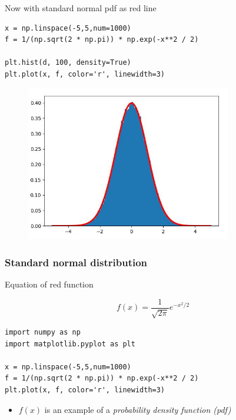 \documentclass[english,14pt]{beamer}
\newcommand\red[1]{{\color{red} #1}}
\begin{document}
\begin{frame}[fragile]

\frametitle{}

Now with standard normal pdf as red line

\begin{lstlisting}[style=CStyle,basicstyle=\scriptsize]
x = np.linspace(-5,5,num=1000)
f = 1/(np.sqrt(2 * np.pi)) * np.exp(-x**2 / 2)

plt.hist(d, 100, density=True)
plt.plot(x, f, color='r', linewidth=3)
\end{lstlisting}

\begin{figure}[ht]
	\centering
	\includegraphics[width=0.8\textwidth]{figures/histWithpdf}
\end{figure}

\end{frame}


\begin{frame}[fragile]

\frametitle{Standard normal distribution}

Equation of red function

\[
f(x) = \frac{1}{\sqrt{2\pi}} e^{-x^2/2}
\]

\begin{lstlisting}[style=CStyle,basicstyle=\scriptsize]
import numpy as np
import matplotlib.pyplot as plt

x = np.linspace(-5,5,num=1000)
f = 1/(np.sqrt(2 * np.pi)) * np.exp(-x**2 / 2)
plt.plot(x, f, color='r', linewidth=3)
\end{lstlisting}

\begin{itemize}
	\item[] $f(x)$ is an example of a \red{\emph{probability density function (pdf)}}
\end{itemize}

\end{frame}
\end{document}
